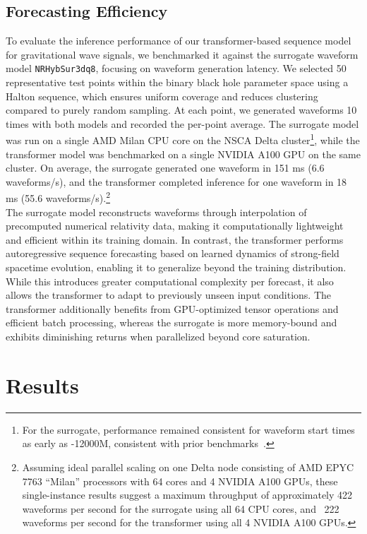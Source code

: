 \documentclass[12pt]{iopart}
\begin{document}
\subsection{Forecasting Efficiency}
To evaluate the inference performance of our transformer-based sequence model for gravitational wave signals, we benchmarked it against the surrogate waveform model \texttt{NRHybSur3dq8}, focusing on waveform generation latency. We selected 50 representative test points within the binary black hole parameter space using a Halton sequence, which ensures uniform coverage and reduces clustering compared to purely random sampling\cite{HALTON1960}. At each point, we generated waveforms 10 times with both models and recorded the per-point average. The surrogate model was run on a single AMD Milan CPU core on the NSCA Delta cluster\footnote{For the surrogate, performance remained consistent for waveform start times as early as -12000M, consistent with prior benchmarks~\cite{PhysRevX.4.031006}.}, while the transformer model was benchmarked on a single NVIDIA A100 GPU on the same cluster. On average, the surrogate generated one waveform in 151 ms (6.6 waveforms/s), and the transformer completed inference for one waveform in 18 ms (55.6 waveforms/s).\footnote{Assuming ideal parallel scaling on one Delta node consisting of 
AMD EPYC 7763 ``Milan'' processors with 64 cores and 4 NVIDIA A100 GPUs, 
these single-instance results suggest a maximum throughput of approximately 422 waveforms per second for the surrogate using all 64 CPU cores, and ~222 waveforms per second for the transformer using all 4 NVIDIA A100 GPUs.}\\
The surrogate model reconstructs waveforms through interpolation of precomputed numerical relativity data, making it computationally lightweight and efficient within its training domain. In contrast, the transformer performs autoregressive sequence forecasting based on learned dynamics of strong-field spacetime evolution, enabling it to generalize beyond the training distribution. While this introduces greater computational complexity per forecast, it also allows the transformer to adapt to previously unseen input conditions. The transformer additionally benefits from GPU-optimized tensor operations and efficient batch processing, whereas the surrogate is more memory-bound and exhibits diminishing returns when parallelized beyond core saturation.



\section{Results}
\label{sec:res}
\end{document}
